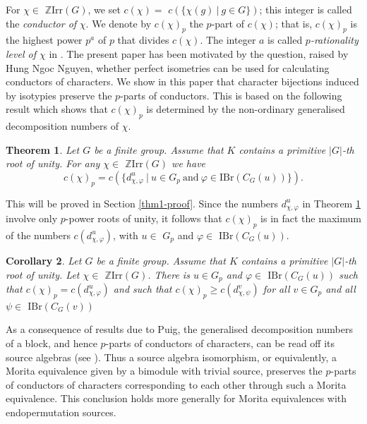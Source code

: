 \documentclass{amsart} %
\theoremstyle{plain}\newtheorem{Theorem}{Theorem}[section]
\theoremstyle{plain}\newtheorem{Conjecture}[Theorem]{Conjecture}
\theoremstyle{plain}\newtheorem{Corollary}[Theorem]{Corollary}
\theoremstyle{plain}\newtheorem{Lemma}[Theorem]{Lemma}
\theoremstyle{plain}\newtheorem{Proposition}[Theorem]{Proposition}
\theoremstyle{definition}\newtheorem{Definition}[Theorem]{Definition}
\theoremstyle{definition}\newtheorem{Example}[Theorem]{Example}
\theoremstyle{definition}\newtheorem{Examples}[Theorem]{Examples}
\theoremstyle{definition}\newtheorem{Remark}[Theorem]{Remark}
\theoremstyle{definition}\newtheorem{Remarks}[Theorem]{Remarks}
\theoremstyle{plain}\newtheorem{Statement}[Theorem]{}
\def\Z{{\mathbb Z}}
\def\IBr{\mathrm{IBr}}
\def\Irr{\mathrm{Irr}}           \def\tenK{\otimes_K}
\begin{document}
\medskip
For $\chi\in$ $\Z\Irr(G)$, we set $c(\chi)=$ $c(\{\chi(g)\ |\ g\in G\})$; this
integer is called the {\em conductor of} $\chi$. 
We denote by $c(\chi)_p$ the $p$-part of $c(\chi)$; that is, $c(\chi)_p$ is
the highest power $p^a$ of $p$ that divides $c(\chi)$. The integer $a$ is called
{\em $p$-rationality level of $\chi$} in  \cite{HungFry}.  
The present paper has been motivated by the question, raised by
Hung Ngoc Nguyen, whether perfect isometries can be used 
for calculating conductors of characters. We show in this paper
that character bijections induced by isotypies preserve the $p$-parts of conductors.
This is based on the  following result which shows that $c(\chi)_p$ is determined 
by the non-ordinary generalised decomposition numbers of $\chi$. 

\begin{Theorem}\label{thm1}
Let $G$ be a finite group. Assume that $K$ contains a primitive $|G|$-th root 
of unity.  For any $\chi\in$ $\Z\Irr(G)$ we have 
$$c(\chi)_p = c\left(\{d^u_{\chi,\varphi}\ |\ u\in G_p\ \text{and}\ 
\varphi\in\IBr(C_G(u))\}\right).$$
\end{Theorem}

This will be proved in Section \ref{thm1-proof}. Since the numbers $d^u_{\chi,\varphi}$ in
Theorem \ref{thm1} involve only $p$-power roots of unity, it follows that
$c(\chi)_p$ is in fact the maximum of the numbers $c(d^u_{\chi,\varphi})$, with
$u\in$ $G_p$ and $\varphi\in$ $\IBr(C_G(u))$. 


\begin{Corollary}\label{Cor05}
Let $G$ be a finite group. Assume that $K$ contains a primitive $|G|$-th root 
of unity.  Let $\chi\in$ $\Z\Irr(G)$. There is $u\in G_p$ and $\varphi\in$
$\IBr(C_G(u))$ such that $c(\chi)_p=c(d^u_{\chi,\varphi})$ and such that
$c(\chi)_p \geq c(d^{v}_{\chi, \psi})$ for all $v\in G_p$ and
all $\psi \in$ $\IBr(C_G(v))$
\end{Corollary}


As a consequence of results due to Puig,  the  generalised decomposition numbers 
of a block, and hence $p$-parts of conductors of characters, 
can be read off its source  algebras (see \cite[Remark 6.13.10]{LiBookII}).
Thus a source algebra isomorphism, or equivalently, a Morita equivalence given
by a bimodule with trivial source,   preserves the $p$-parts of conductors of
characters corresponding to each other through such a Morita equivalence.
This conclusion holds more generally for Morita equivalences with endopermutation
sources.
\end{document}
